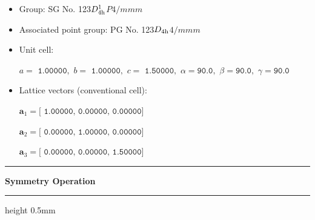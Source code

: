\documentclass[fleqn,10pt,landscape]{jsarticle}
\begin{document}
\begin{itemize}
\item Group: SG No. 123\quad$D_{\rm 4h}^{1}$\quad$P4/mmm$\quad[ tetragonal ]
\item Associated point group: PG No. 123\quad$D_{\rm 4h}$\quad$4/mmm$\quad[ tetragonal ]
\end{itemize}
\begin{itemize}
\item Unit cell:

\quad $a=\texttt{ 1.00000},\,\, b=\texttt{ 1.00000},\,\, c=\texttt{ 1.50000},\,\, \alpha=\texttt{90.0},\,\, \beta=\texttt{90.0},\,\, \gamma=\texttt{90.0}$

\item Lattice vectors (conventional cell):

\quad $\bm{a}_1=\texttt{[ 1.00000, 0.00000, 0.00000]}$

\quad $\bm{a}_2=\texttt{[ 0.00000, 1.00000, 0.00000]}$

\quad $\bm{a}_3=\texttt{[ 0.00000, 0.00000, 1.50000]}$

\end{itemize}
\vspace{5mm}
\noindent \rule[0.5mm]{5mm}{0.5mm}\hspace{3mm}\textbf{Symmetry Operation}\hspace{3mm}\leaders\hrule height 0.5mm\hfill\kern0pt
\vspace{3mm}
\end{document}
